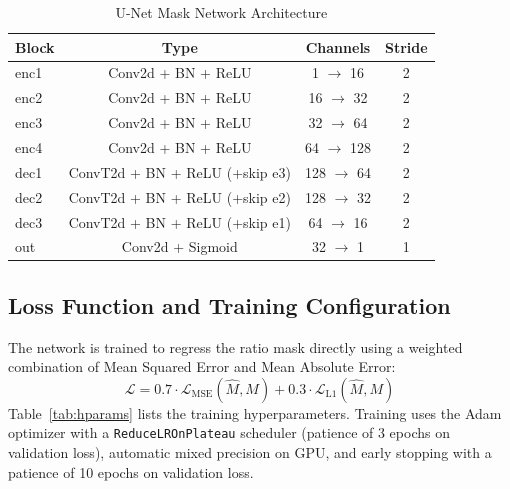 \documentclass[conference]{IEEEtran}
\begin{document}
\begin{table}[htbp]
\caption{U-Net Mask Network Architecture}
\begin{center}
\begin{tabular}{lccc}
\toprule
\textbf{Block} & \textbf{Type} & \textbf{Channels} & \textbf{Stride} \\
\midrule
enc1 & Conv2d + BN + ReLU & 1 $\rightarrow$ 16 & 2 \\
enc2 & Conv2d + BN + ReLU & 16 $\rightarrow$ 32 & 2 \\
enc3 & Conv2d + BN + ReLU & 32 $\rightarrow$ 64 & 2 \\
enc4 & Conv2d + BN + ReLU & 64 $\rightarrow$ 128 & 2 \\
dec1 & ConvT2d + BN + ReLU (+skip e3) & 128 $\rightarrow$ 64 & 2 \\
dec2 & ConvT2d + BN + ReLU (+skip e2) & 128 $\rightarrow$ 32 & 2 \\
dec3 & ConvT2d + BN + ReLU (+skip e1) & 64 $\rightarrow$ 16 & 2 \\
out & Conv2d + Sigmoid & 32 $\rightarrow$ 1 & 1 \\
\bottomrule
\end{tabular}
\label{tab:arch}
\end{center}
\end{table}

\subsection{Loss Function and Training Configuration}
The network is trained to regress the ratio mask directly using a weighted combination of Mean Squared Error and Mean Absolute Error:
\begin{equation}
\mathcal{L} = 0.7\cdot \mathcal{L}_{\text{MSE}}(\hat{M}, M) + 0.3\cdot \mathcal{L}_{\text{L1}}(\hat{M}, M)
\end{equation}
Table~\ref{tab:hparams} lists the training hyperparameters. Training uses the Adam optimizer with a \texttt{ReduceLROnPlateau} scheduler (patience of 3 epochs on validation loss), automatic mixed precision on GPU, and early stopping with a patience of 10 epochs on validation loss.
\end{document}
